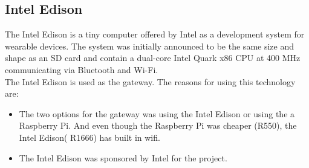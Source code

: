 \subsection{Intel Edison}
The Intel Edison is a tiny computer offered by Intel as a development system for wearable devices. The system was initially announced to be the same size and shape as an SD card and contain a dual-core Intel Quark x86 CPU at 400 MHz communicating via Bluetooth and Wi-Fi.
\\The Intel Edison is used as the gateway. The reasons for using this technology are:
\begin{itemize}
\item The two options for the gateway was using the Intel Edison or using the a Raspberry Pi. And even though the Raspberry Pi was cheaper (R550), the Intel Edison( R1666) has built in wifi. 
\item The Intel Edison was sponsored by Intel for the project.
\end{itemize}